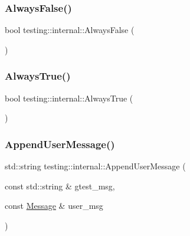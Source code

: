 \mbox{\label{namespacetesting_1_1internal_a4b24c851ab13569b1b15b3d259b60d2e}} 
\subsubsection{\texorpdfstring{AlwaysFalse()}{AlwaysFalse()}}
{\footnotesize\ttfamily bool testing\+::internal\+::\+Always\+False (\begin{DoxyParamCaption}{ }\end{DoxyParamCaption})\hspace{0.3cm}{\ttfamily [inline]}}

\mbox{\label{namespacetesting_1_1internal_a922c9da63cd4bf94fc473b9ecac76414}} 
\subsubsection{\texorpdfstring{AlwaysTrue()}{AlwaysTrue()}}
{\footnotesize\ttfamily bool testing\+::internal\+::\+Always\+True (\begin{DoxyParamCaption}{ }\end{DoxyParamCaption})}

\mbox{\label{namespacetesting_1_1internal_ae475a090bca903bb222dd389eb189166}} 
\subsubsection{\texorpdfstring{AppendUserMessage()}{AppendUserMessage()}}
{\footnotesize\ttfamily std\+::string testing\+::internal\+::\+Append\+User\+Message (\begin{DoxyParamCaption}\item[{const std\+::string \&}]{gtest\+\_\+msg,  }\item[{const \mbox{\hyperlink{classtesting_1_1_message}{Message}} \&}]{user\+\_\+msg }\end{DoxyParamCaption})}

